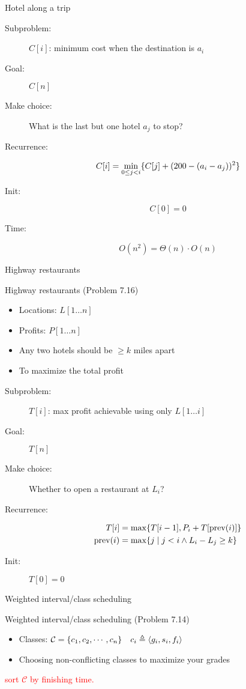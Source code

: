 \begin{frame}{Hotel along a trip}
  \begin{description}
	\item[Subproblem:] $C[i]$: minimum cost when the destination is $a_{i}$
	\item[Goal:] $C[n]$
	\pause
	\item[Make choice:] What is the last but one hotel $a_{j}$ to stop?
	\item[Recurrence:] 
	  \[
		C[i] = \min_{0 \le j < i} \{C[j] + (200 - (a_{i} - a_{j}))^{2}\}
	  \]
	\pause
	\item[Init:]
	  \[
		C[0] = 0
	  \]
	\item[Time:] 
	  \[
		O(n^2) = \Theta(n) \cdot O(n)
	  \]
  \end{description}
\end{frame}
\begin{frame}{Highway restaurants}
  \begin{exampleblock}{Highway restaurants (Problem 7.16)}
	\begin{itemize}
	  \item Locations: $L[1 \dots n]$
	  \item Profits: $P[1 \dots n]$
	  \item Any two hotels should be $\ge k$ miles apart
	  \item To maximize the total profit
	\end{itemize}
  \end{exampleblock}

  \begin{description}
	\item[Subproblem:] $T[i]$: max profit achievable using only $L[1 \dots i]$
	\item[Goal:] $T[n]$
	  \pause
	\item[Make choice:] Whether to open a restaurant at $L_i$?
	\item[Recurrence:] 
	  \begin{align*}
		T[i] &= \max\{T[i-1], P_i + T[\text{prev}(i)]\} \\
		\text{prev}(i) &= \max\{j \mid j < i \land L_i - L_j \ge k\}
	  \end{align*}
	  \pause
	\item[Init:] $T[0] = 0$
  \end{description}
\end{frame}
\begin{frame}{Weighted interval/class scheduling}
  \begin{exampleblock}{Weighted interval/class scheduling (Problem 7.14)}
    \begin{itemize}
      \item Classes: $\mathcal{C} = \{c_{1}, c_{2}, \cdots, c_{n}\} \quad c_{i} \triangleq \langle g_{i}, s_{i}, f_{i} \rangle$
      \item Choosing non-conflicting classes to maximize your grades
    \end{itemize}
  \end{exampleblock}

  \centerline{\textcolor{red}{sort $\mathcal{C}$ by finishing time.}}
\end{frame}

